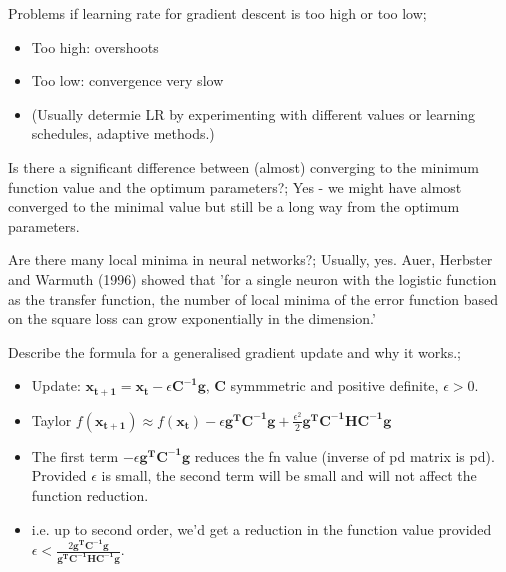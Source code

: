 \documentclass{article}
\begin{document}
Problems if learning rate for gradient descent is too high or too low; \begin{itemize} \item Too high: overshoots \item Too low: convergence very slow \item (Usually determie LR by experimenting with different values or learning schedules, adaptive methods.) \end{itemize}

Is there a significant difference between (almost) converging to the minimum function value and the optimum parameters?; Yes - we might have almost converged to the minimal value but still be a long way from the optimum parameters.

Are there many local minima in neural networks?; Usually, yes. Auer, Herbster and Warmuth (1996) showed that 'for a single neuron with the logistic function as the transfer function, the number of local minima of the error function based on the square loss can grow exponentially in the dimension.' 

Describe the formula for a generalised gradient update and why it works.; \begin{itemize} \item Update: $\mathbf{x_{t+1}}=\mathbf{x_t}-\epsilon \mathbf{C^{-1}g}$, $\mathbf{C}$ symmmetric and positive definite, $\epsilon > 0$.  \item Taylor $f(\mathbf{x_{t+1}})\approx f(\mathbf{x_t})-\epsilon \mathbf{g^TC^{-1}g}+\frac{\epsilon^2}{2}\mathbf{g^TC^{-1}HC^{-1}g}$ \item The first term $-\epsilon \mathbf{g^TC^{-1}g}$ reduces the fn value (inverse of pd matrix is pd). Provided $\epsilon$ is small, the second term will be small and will not affect the function reduction. \item i.e. up to second order, we'd get a reduction in the function value provided $\epsilon < \frac{2\mathbf{g^TC^{-1}g}}{\mathbf{g^TC^{-1}HC^{-1}g}}$.  \end{itemize}
\end{document}
